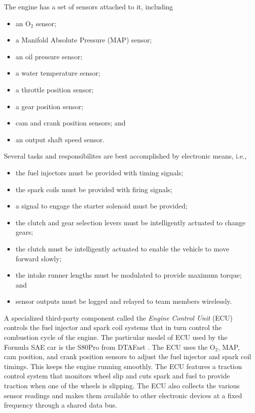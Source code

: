 The engine has a set of sensors attached to it, including

\begin{itemize}
\item an O$_{2}$ sensor;
\item a Manifold Absolute Pressure (MAP) sensor; 
\item an oil pressure sensor;
\item a water temperature sensor;
\item a throttle position sensor;
\item a gear position sensor;
\item cam and crank position sensors; and
\item an output shaft speed sensor.
\end{itemize}

Several tasks and responsibilites are best accomplished by electronic means, i.e.,

\begin{itemize}
\item the fuel injectors must be provided with timing signals;
\item the spark coils must be provided with firing signals;
\item a signal to engage the starter solenoid must be provided;
\item the clutch and gear selection levers must be intelligently actuated to change gears; 
\item the clutch must be intelligently actuated to enable the vehicle to move forward slowly;
\item the intake runner lengths must be modulated to provide maximum torque; and
\item sensor outputs must be logged and relayed to team members wirelessly.
\end{itemize}

A specialized third-party component called the \emph{Engine Control Unit} (ECU) controls the fuel injector and spark coil systems that in turn control the combustion cycle of the engine. The particular model of ECU used by the Formula SAE car is the S80Pro from DTAFast \cite{s60pro}. The ECU uses the O$_{2}$, MAP, cam position, and crank position sensors to adjust the fuel injector and spark coil timings. This keeps the engine running smoothly. The ECU features a traction control system that monitors wheel slip and cuts spark and fuel to provide traction when one of the wheels is slipping. The ECU also collects the various sensor readings and makes them available to other electronic devices at a fixed frequency through a shared data bus. 


